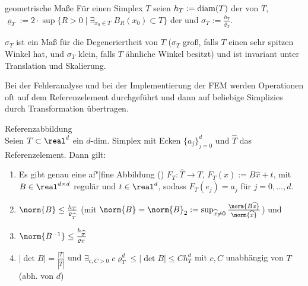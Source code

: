 \linie

\begin{Def}{geometrische Maße}
    Für einen Simplex $T$ seien
    $h_T := \operatorname{diam}(T)$ der  von $T$,
    $\varrho_T := 2 \cdot \sup\{R > 0 \;|\; \exists_{x_0 \in T}\; B_R(x_0) \subset T\}$
    der  und
    $\sigma_T := \frac{h_T}{\varrho_T}$.
\end{Def}

\begin{Bem}
    $\sigma_T$ ist ein Maß für die Degeneriertheit von $T$
    ($\sigma_T$ groß, falls $T$ einen sehr spitzen Winkel hat,
    und $\sigma_T$ klein, falls $T$ ähnliche Winkel besitzt)
    und ist invariant unter Translation und Skalierung.
\end{Bem}

\linie

\begin{Bem}
    Bei der Fehleranalyse und bei der Implementierung der FEM werden Operationen
    oft auf dem Referenzelement durchgeführt und dann auf
    beliebige Simplizies durch Transformation übertragen.
\end{Bem}

\begin{Satz}{Referenzabbildung}\\
    Seien $T \subset \real^d$ ein $d$-dim. Simplex mit Ecken $\{a_j\}_{j=0}^d$ und
    $\widehat{T}$ das Referenzelement.
    Dann gilt:
    \begin{enumerate}
        \item
        Es gibt genau eine af"|fine Abbildung ()
        $F_T\colon \widehat{T} \to T$,
        $F_T(\widehat{x}) := B\widehat{x} + t$,
        mit $B \in \real^{d \times d}$ regulär und $t \in \real^d$,
        sodass $F_T(e_j) = a_j$ für $j = 0, \dotsc, d$.
        
        \item
        $\norm{B} \le \frac{h_T}{\varrho_{\widehat{T}}}$
        (mit $\norm{B} = \norm{B}_2 := \sup_{\widehat{x}\not=0}
        \frac{\norm{B\widehat{x}}}{\norm{\widehat{x}}}$) und
        
        \item
        $\norm{B^{-1}} \le \frac{h_{\widehat{T}}}{\varrho_T}$
        
        \item
        $|\det B| = \frac{|T|}{|\widehat{T}|}$ und
        $\exists_{c, C > 0}\; c\varrho_T^d \le |\det B| \le Ch_T^d$
        mit $c, C$ unabhängig von $T$ (abh. von $d$)
    \end{enumerate}
\end{Satz}

